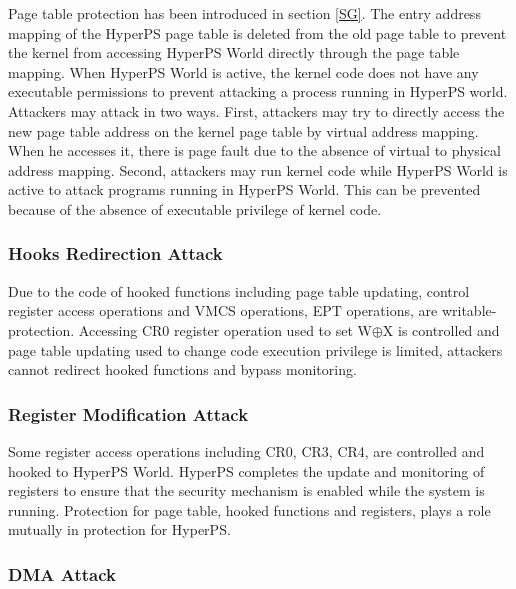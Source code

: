 ﻿\documentclass[conference]{IEEEtran}
\begin{document}
Page table protection has been introduced in section \ref{SG}. The entry address mapping of the HyperPS page table is deleted from the old page table to prevent the kernel from accessing HyperPS World directly through the page table mapping. 
When HyperPS World is active, the kernel code does not have any executable permissions to prevent attacking a  process running in HyperPS world.
Attackers may attack in two ways.
First, attackers may try to directly access the new page table address on the kernel page table by virtual address mapping. When he accesses it, there is page fault due to the absence of virtual to physical address mapping.
Second, attackers may run kernel code while HyperPS World is active to attack programs running in HyperPS World. This can be prevented because of the absence of executable privilege of kernel code.



\subsubsection{Hooks Redirection Attack}

Due to the code of hooked functions including page table updating, control register access operations and VMCS operations, EPT operations, are writable-protection. Accessing CR0 register operation used to set W$\oplus${X} is controlled and page table updating used to change code execution privilege is limited, attackers cannot redirect hooked functions and bypass monitoring.

\subsubsection{Register Modification Attack}

Some register access operations including CR0, CR3, CR4, are controlled and hooked to HyperPS World. 
HyperPS completes the update and monitoring of registers to ensure that the security mechanism is enabled while the system is running. 
 Protection for page table, hooked functions and registers, plays a role mutually in protection for HyperPS. 

\subsubsection{DMA Attack}
\end{document}
